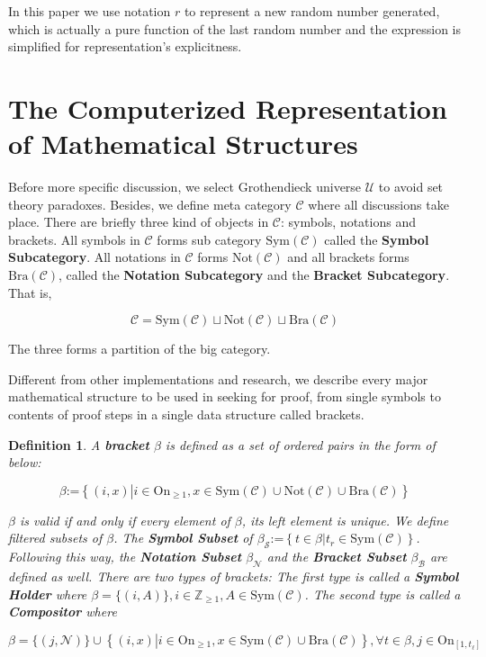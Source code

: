 \documentclass{article}
\newtheorem{definition}{Definition}
\begin{document}
In this paper we use notation \(\mathit{r}\) to represent a new random number generated, which is actually a pure function of the last random number and the expression is simplified for representation{'}s explicitness.

\section*{The Computerized Representation of Mathematical Structures}

Before more specific discussion, we select Grothendieck universe \(\mathcal{U}\) \cite{1} to avoid set theory paradoxes. Besides, we define meta category \(\mathcal{C}\) where all discussions take place. There are briefly three kind of objects in \(\mathcal{C}\): symbols, notations and brackets. All symbols in \(\mathcal{C}\) forms sub category \(\text{Sym}(\mathcal{C})\) called the \textbf{ Symbol Subcategory}. All notations in \(\mathcal{C}\) forms \(\text{Not}(\mathcal{C})\) and all brackets forms \(\text{Bra}(\mathcal{C})\), called the \textbf{ Notation Subcategory} and the \textbf{ Bracket Subcategory}. That is,

\[\mathcal{C}=\text{Sym}(\mathcal{C})\sqcup \text{Not}(\mathcal{C})\sqcup \text{Bra}(\mathcal{C})\]

The three forms a partition of the big category.

Different from other implementations and research, we describe every major mathematical structure to be used in seeking for proof, from single symbols to contents of proof steps in a single data structure called brackets.

\begin{definition}
	A \textbf{ bracket} \(\beta\) is defined as a set of ordered pairs in the form of below:
	
	\[\beta \text{:=}\left\{(i,x)\left|i\in \text{On}_{\geq 1}\right.,x\in \text{Sym}(\mathcal{C})\cup \text{Not}(\mathcal{C})\cup \text{Bra}(\mathcal{C})\right\}\]
	
	\(\beta\) is valid if and only if every element of \(\beta\), its left element is unique. We define filtered subsets of \(\beta\). The \textbf{ Symbol Subset} of \(\beta _{\mathcal{S}}\text{:=}\left\{t\in \beta \left|t_{\mathit{r}}\in \text{Sym}(\mathcal{C})\right.\right\}\). Following this way, the \textbf{ Notation Subset} \(\beta _{\mathcal{N}}\) and the \textbf{ Bracket Subset} \(\beta _{\mathcal{B}}\) are defined as well. There are two types of brackets: The first type is called a \textbf{ Symbol Holder} where \(\beta =\{(i,A)\},i\in \mathbb{Z}_{\geq 1},A\in \text{Sym}(\mathcal{C})\). The second type is called a \textbf{ Compositor} where
	
	\[\beta =\{(j,\mathcal{N})\}\cup \left\{(i,x)\left|i\in \text{On}_{\geq 1}\right., x\in \text{Sym}(\mathcal{C})\cup \text{Bra}(\mathcal{C})\right\},\forall
	t\in \beta ,j\in \text{On}_{\left[1,t_{\ell }\right]}\]
\end{definition}
\end{document}
